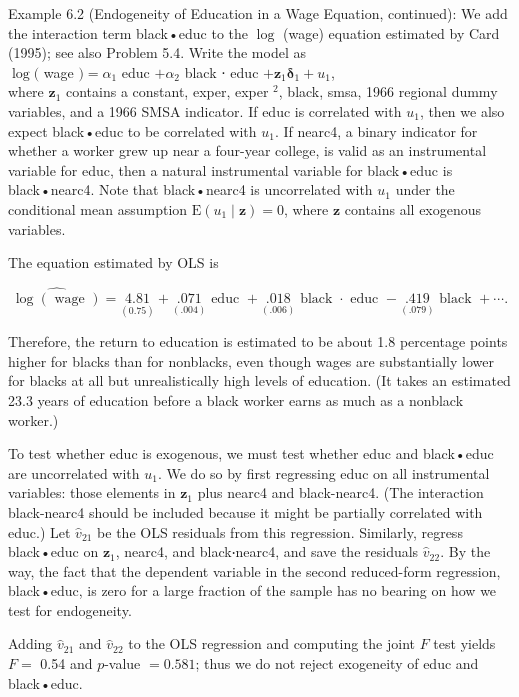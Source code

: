 \documentclass[10pt]{article}
\begin{document}
Example 6.2 (Endogeneity of Education in a Wage Equation, continued): We add the interaction term black•educ to the $\log$ (wage) equation estimated by Card (1995); see also Problem 5.4. Write the model as\\
$\log ($ wage $)=\alpha_{1}$ educ $+\alpha_{2}$ black ⋅ educ $+\mathbf{z}_{1} \boldsymbol{\delta}_{1}+u_{1}$,\\
where $\mathbf{z}_{1}$ contains a constant, exper, exper ${ }^{2}$, black, smsa, 1966 regional dummy variables, and a 1966 SMSA indicator. If educ is correlated with $u_{1}$, then we also expect black•educ to be correlated with $u_{1}$. If nearc4, a binary indicator for whether a worker grew up near a four-year college, is valid as an instrumental variable for educ, then a natural instrumental variable for black•educ is black•nearc4. Note that black•nearc4 is uncorrelated with $u_{1}$ under the conditional mean assumption $\mathrm{E}\left(u_{1} \mid \mathbf{z}\right)=0$, where $\mathbf{z}$ contains all exogenous variables.

The equation estimated by OLS is

$$
\widehat{\log (\text { wage })}=\underset{(0.75)}{4.81}+\underset{(.004)}{.071} \text { educ }+\underset{(.006)}{.018} \text { black } \cdot \text { educ }-\underset{(.079)}{.419} \text { black }+\cdots .
$$

Therefore, the return to education is estimated to be about 1.8 percentage points higher for blacks than for nonblacks, even though wages are substantially lower for blacks at all but unrealistically high levels of education. (It takes an estimated 23.3 years of education before a black worker earns as much as a nonblack worker.)

To test whether educ is exogenous, we must test whether educ and black•educ are uncorrelated with $u_{1}$. We do so by first regressing educ on all instrumental variables: those elements in $\mathbf{z}_{1}$ plus nearc4 and black-nearc4. (The interaction black-nearc4 should be included because it might be partially correlated with educ.) Let $\hat{v}_{21}$ be the OLS residuals from this regression. Similarly, regress black•educ on $\mathbf{z}_{1}$, nearc4, and black‧nearc4, and save the residuals $\hat{v}_{22}$. By the way, the fact that the dependent variable in the second reduced-form regression, black•educ, is zero for a large fraction of the sample has no bearing on how we test for endogeneity.

Adding $\hat{v}_{21}$ and $\hat{v}_{22}$ to the OLS regression and computing the joint $F$ test yields $F=$ 0.54 and $p$-value $=0.581$; thus we do not reject exogeneity of educ and black•educ.
\end{document}

